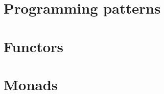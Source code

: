 \documentclass[xcolor={table}]{beamer}
\begin{document}
\section{Programming patterns}

\begin{frame}{}{}


\end{frame}

\section{Functors}

\begin{frame}{}{}


\end{frame}


\section{Monads}

\begin{frame}{}{}


\end{frame}
\end{document}
